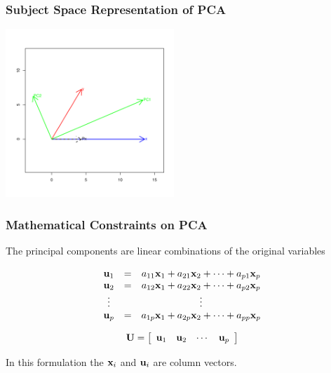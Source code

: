 \documentclass{beamer}
\begin{document}
\begin{frame}
  \frametitle{Subject Space Representation of PCA}

\begin{center}
\includegraphics[height=2.5in]{fig-bivariate-pca-vectors.pdf}
\smallskip


\end{center}  

\end{frame}


\begin{frame}
  \frametitle{Mathematical Constraints on PCA}

The principal components are linear combinations of the original variables
\medskip

\[ \begin{array}{ccc}
\mathbf{u}_1 & = & a_{11}\mathbf{x}_1 + a_{21}\mathbf{x}_2 + \cdots + a_{p1}\mathbf{x}_p \\
\mathbf{u}_2 & = & a_{12}\mathbf{x}_1 + a_{22}\mathbf{x}_2 + \cdots + a_{p2}\mathbf{x}_p \\
\vdots & & \vdots \\
\mathbf{u}_p & = & a_{1p}\mathbf{x}_1 + a_{2p}\mathbf{x}_2 + \cdots + a_{pp}\mathbf{x}_p \\
\end{array}
\]

\bigskip

\[
\mathbf{U}  =  \left[ \begin{array}{cccc}
\mathbf{u}_1 & \mathbf{u}_2 & \cdots &  \mathbf{u}_p\\
\end{array} \right]
\]

In this formulation the $\mathbf{x}_i$ and $\mathbf{u}_i$ are column vectors.


\end{frame}
\end{document}
